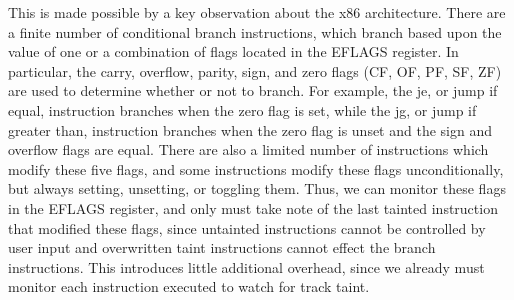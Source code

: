 \documentclass[11pt,expanded,copyright]{fsuthesis}
\begin{document}
This is made possible by a key observation about the x86 architecture. There are a finite number of conditional branch instructions, which branch based upon the value of one or a combination of flags located in the EFLAGS register. In particular, the carry, overflow, parity, sign, and zero flags (CF, OF, PF, SF, ZF) are used to determine whether or not to branch. For example, the je, or jump if equal, instruction branches when the zero flag is set, while the jg, or jump if greater than, instruction branches when the zero flag is unset and the sign and overflow flags are equal. There are also a limited number of instructions which modify these five flags, and some instructions modify these flags unconditionally, but always setting, unsetting, or toggling them. Thus, we can monitor these flags in the EFLAGS register, and only must take note of the last tainted instruction that modified these flags, since untainted instructions cannot be controlled by user input and overwritten taint instructions cannot effect the branch instructions. This introduces little additional overhead, since we already must monitor each instruction executed to watch for track taint.


\begin{figure}
\end{figure}
\end{document}
